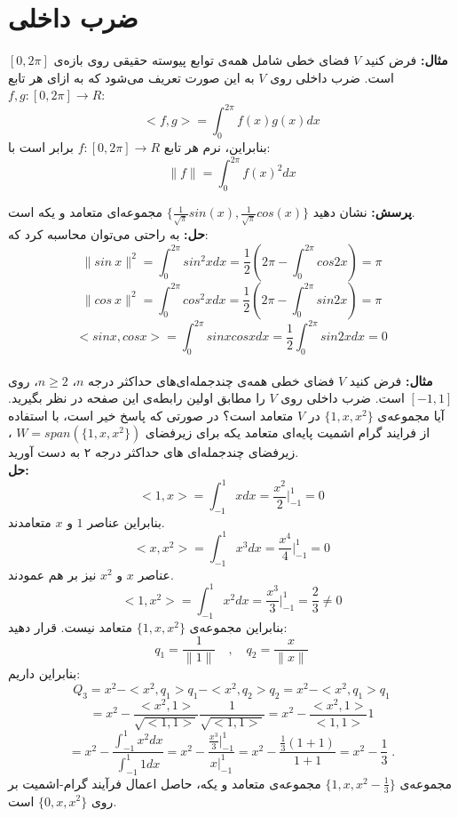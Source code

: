 
	\chapter{ضرب داخلی}
	\textbf{مثال:}
	فرض کنید $V$ فضا‌ی خطی شامل همه‌ی توابع پیوسته حقیقی روی بازه‌ی $[0,2\pi]$ است. ضرب داخلی روی $V$ به این صورت تعریف می‌شود که به ازای هر تابع $f,g:[0,2\pi] \rightarrow R$:\\
	$$<f,g> = \int_0^{2\pi} f(x)g(x) dx$$
	بنابراین، نرم هر تابع $f:[0,2\pi] \rightarrow R$ برابر است با: 
	$$\parallel f \parallel = \int_0^{2\pi} f(x)^2 dx$$
	
	\textbf{پرسش:}
	نشان دهید $\{\frac{1}{\sqrt\pi}sin(x), \frac{1}{\sqrt{\pi}}cos (x)\}$ مجموعه‌ای متعامد و یکه است.\\
	\textbf{حل:}
	به راحتی می‌توان محاسبه کرد که:
	$$\parallel sin\:x \parallel^2 =  \int_0^{2\pi} sin^2 x dx = \frac{1}{2}(2\pi - \int_0^{2\pi} cos 2x ) = \pi$$
	$$\parallel cos \:x \parallel^2 =  \int_0^{2\pi} cos^2 x dx = \frac{1}{2}(2\pi - \int_0^{2\pi} sin 2x ) = \pi$$
	$$<sin x , cos x> = \int_0^{2\pi} sin x cos x dx = \frac{1}{2}\int_0^{2\pi} sin 2x dx = 0$$\\
	\textbf{مثال:}
	فرض کنید $V$ فضا‌ی خطی همه‌ی چندجمله‌ای‌های حداکثر درجه $n$، $n\geq 2$، روی $[-1,1]$ است. ضرب داخلی روی $V$ را مطابق اولین رابطه‌ی این صفحه در نظر بگیرید. آیا مجموعه‌ی $\{1,x,x^2\}$ در $V$ متعامد است؟ در صورتی که پاسخ خیر است، با استفاده از فرایند گرام اشمیت پایه‌ای متعامد یکه برای زیر‌فضا‌ی $W = span(\{1,x,x^2\})$ ، زیر‌فضای چند‌جمله‌ای ‌های حداکثر درجه ۲ به دست آورید.\\
	\textbf{حل:}
	$$<1,x> = \int_{-1}^1 x dx = \frac{x^2}{2}\big|_{-1}^1 = 0$$
	بنابراین عناصر $1$ و $x$ متعامدند.
	$$<x,x^2> = \int_{-1}^1 x^3 dx = \frac{x^4}{4} \big |_{-1}^1 = 0$$
	عناصر $x$ و $x^2$ نیز بر هم عمودند.
	$$<1,x^2> = \int_{-1}^1 x^2 dx = \frac{x^3}{3} \big |_{-1}^1 = \frac{2}{3} \neq 0$$
	بنابراین مجموعه‌ی $\{1 , x , x^2\}$ متعامد نیست. قرار دهید:
	$$q_1 = \frac{1}{\parallel 1\parallel} \quad , \quad q_2 = \frac{x}{\parallel x \parallel}$$
	بنابراین داریم:
	$$Q_3 = x^2 - <x^2,q_1>q_1 - <x^2,q_2>q_2 = x^2 - <x^2,q_1>q_1$$
	$$= x^2 - \frac{<x^2,1>}{\sqrt{<1,1>}}\frac{1}{\sqrt{<1,1>}} = x^2 - \frac{<x^2,1>}{<1,1>}1$$
	$$ = x^2 - \frac{\int_{-1}^1 x^2 dx }{\int_{-1}^1 1 dx } = x^2 - \frac{\frac{x^3}{3}\big|_{-1}^1}{x\big|_{-1}^1} = x^2 - \frac{\frac{1}{3}(1+1)}{1+1} = x^2 - \frac{1}{3} \; .$$
	مجموعه‌ی $\{1,x , x^2-\frac{1}{3}\}$ مجموعه‌ی متعامد و یکه، حاصل اعمال فرآیند گرام-اشمیت بر روی $\{0,x,x^2\}$ است.\\\\
